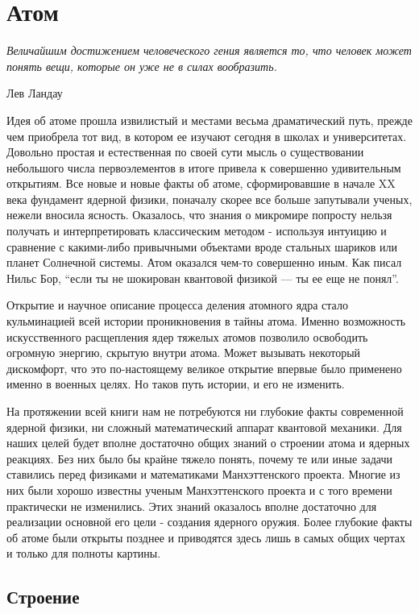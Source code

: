 \chapter{Атом}\label{ch:atom}

\epigraph{\emph{Величайшим достижением человеческого гения является то, что человек может понять вещи, которые он уже не в силах вообразить.}}
{Лев Ландау}

Идея об атоме прошла извилистый и местами весьма драматический путь, прежде чем приобрела тот вид, в котором ее изучают сегодня в школах и университетах.
Довольно простая и естественная по своей сути мысль о существовании небольшого числа первоэлементов в итоге привела к совершенно удивительным открытиям.
Все новые и новые факты об атоме, сформировавшие в начале XX века фундамент ядерной физики, поначалу скорее все больше запутывали ученых, нежели вносила ясность.
Оказалось, что знания о микромире попросту нельзя получать и интерпретировать классическим методом - используя интуицию и сравнение с какими-либо привычными объектами вроде стальных шариков или планет Солнечной системы.
Атом оказался чем-то совершенно иным.
Как писал Нильс Бор, ``если ты не шокирован квантовой физикой — ты ее еще не понял''.

Открытие и научное описание процесса деления атомного ядра стало кульминацией всей истории проникновения в тайны атома. 
Именно возможность искусственного расщепления ядер тяжелых атомов позволило освободить огромную энергию, скрытую внутри атома.
Может вызывать некоторый дискомфорт, что это по-настоящему великое открытие впервые было применено именно в военных целях.
Но таков путь истории, и его не изменить.

На протяжении всей книги нам не потребуются ни глубокие факты современной ядерной физики, ни сложный математический аппарат квантовой механики.
Для наших целей будет вполне достаточно общих знаний о строении атома и ядерных реакциях.
Без них было бы крайне тяжело понять, почему те или иные задачи ставились перед физиками и математиками Манхэттенского проекта.
Многие из них были хорошо известны ученым Манхэттенского проекта и с того времени практически не изменились.  
Этих знаний оказалось вполне достаточно для реализации основной его цели - создания ядерного оружия.
Более глубокие факты об атоме были открыты позднее и приводятся здесь лишь в самых общих чертах и только для полноты картины.


\section*{Строение}

